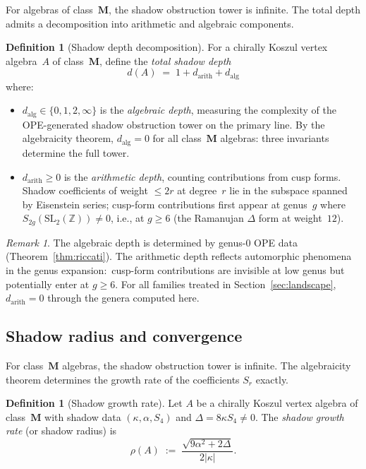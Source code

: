 \documentclass[11pt]{article}
\theoremstyle{plain}
\theoremstyle{definition}
\newtheorem{definition}[theorem]{Definition}
\theoremstyle{remark}
\newtheorem{remark}[theorem]{Remark}
\begin{document}
For algebras of class~$\mathbf{M}$, the shadow obstruction tower is
infinite. The total depth admits a decomposition into
arithmetic and algebraic components.

\begin{definition}[Shadow depth decomposition]
\label{def:depth-decomposition}
For a chirally Koszul vertex algebra~$A$ of class~$\mathbf{M}$,
define the \emph{total shadow depth}
\[
 d(A) \;=\; 1 + d_{\mathrm{arith}} + d_{\mathrm{alg}}
\]
where:
\begin{itemize}
\item $d_{\mathrm{alg}} \in \{0, 1, 2, \infty\}$ is the
 \emph{algebraic depth}, measuring the complexity of the
 OPE-generated shadow obstruction tower on the primary line. By the
 algebraicity theorem, $d_{\mathrm{alg}} = 0$ for all
 class~$\mathbf{M}$ algebras: three invariants determine
 the full tower.
\item $d_{\mathrm{arith}} \geq 0$ is the \emph{arithmetic
 depth}, counting contributions from cusp forms.
 Shadow coefficients of weight $\leq 2r$ at degree~$r$
 lie in the subspace spanned by Eisenstein series;
 cusp-form contributions first appear at genus~$g$ where
 $S_{2g}(\mathrm{SL}_2(\mathbb{Z})) \neq 0$, i.e., at
 $g \geq 6$ (the Ramanujan $\Delta$ form at weight~$12$).
\end{itemize}
\end{definition}

\begin{remark}
The algebraic depth is determined by genus-$0$ OPE data
(Theorem~\ref{thm:riccati}). The arithmetic depth reflects
automorphic phenomena in the genus expansion:\ cusp-form
contributions are invisible at low genus but potentially
enter at $g \geq 6$. For all families treated in
Section~\ref{sec:landscape}, $d_{\mathrm{arith}} = 0$
through the genera computed here.
\end{remark}


\subsection{Shadow radius and convergence}
\label{subsec:shadow-radius}

For class~$\mathbf{M}$ algebras, the shadow obstruction tower is
infinite. The algebraicity theorem determines the growth
rate of the coefficients $S_r$ exactly.

\begin{definition}[Shadow growth rate]
\label{def:shadow-radius}
Let $A$ be a chirally Koszul vertex algebra of
class~$\mathbf{M}$ with shadow data $(\kappa, \alpha, S_4)$
and $\Delta = 8\kappa S_4 \neq 0$. The \emph{shadow growth
rate} (or shadow radius) is
\[
 \rho(A)
 \;:=\;
 \frac{\sqrt{9\alpha^2 + 2\Delta}}{2|\kappa|}.
\]
\end{definition}
\end{document}
